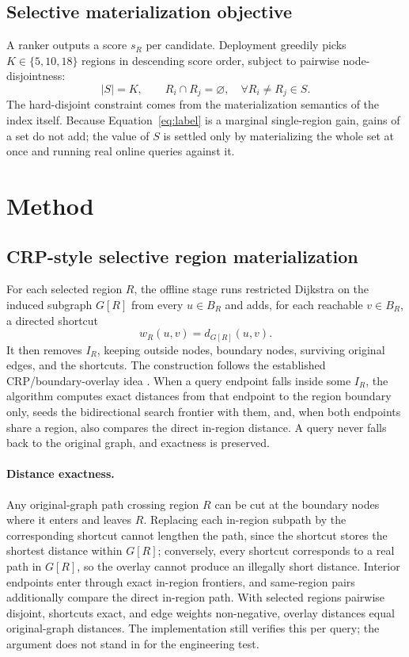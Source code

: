 \documentclass[5p,twocolumn,authoryear]{elsarticle}
\begin{document}
\subsection{Selective materialization objective}

A ranker outputs a score $s_R$ per candidate. Deployment greedily picks
$K\in\{5,10,18\}$ regions in descending score order, subject to pairwise node-disjointness:
\begin{equation}
  |S|=K,\qquad R_i\cap R_j=\varnothing,\quad \forall R_i\ne R_j\in S.
\end{equation}
The hard-disjoint constraint comes from the materialization semantics of the index itself.
Because Equation~\eqref{eq:label} is a marginal single-region gain, gains of a set do not
add; the value of $S$ is settled only by materializing the whole set at once and running
real online queries against it.

\section{Method}

\subsection{CRP-style selective region materialization}

For each selected region $R$, the offline stage runs restricted Dijkstra on the induced
subgraph $G[R]$ from every $u\in B_R$ and adds, for each reachable $v\in B_R$, a directed
shortcut
\begin{equation}
  w_R(u,v)=d_{G[R]}(u,v).
\end{equation}
It then removes $I_R$, keeping outside nodes, boundary nodes, surviving original edges, and
the shortcuts. The construction follows the established CRP/boundary-overlay idea
\citep{salt2014}. When a query endpoint falls inside some $I_R$, the algorithm computes
exact distances from that endpoint to the region boundary only, seeds the bidirectional
search frontier with them, and, when both endpoints share a region, also compares the direct
in-region distance. A query never falls back to the original graph, and exactness is
preserved.

\paragraph{Distance exactness.}
Any original-graph path crossing region $R$ can be cut at the boundary nodes where it
enters and leaves $R$. Replacing each in-region subpath by the corresponding shortcut cannot
lengthen the path, since the shortcut stores the shortest distance within $G[R]$;
conversely, every shortcut corresponds to a real path in $G[R]$, so the overlay cannot
produce an illegally short distance. Interior endpoints enter through exact in-region
frontiers, and same-region pairs additionally compare the direct in-region path. With
selected regions pairwise disjoint, shortcuts exact, and edge weights non-negative, overlay
distances equal original-graph distances. The implementation still verifies this per query;
the argument does not stand in for the engineering test.
\end{document}
